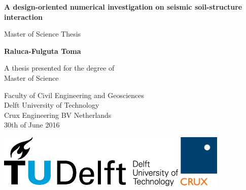 \documentclass[10pt,a4paper]{report}
\begin{document}
	\begin{titlepage}
		  \begin{center}
		  	\vspace*{3cm}
		  	
		  	\textbf{\Huge A design-oriented numerical investigation on seismic
		  		soil-structure interaction}
		  	
		  	\vspace{1cm}
		  	{\large Master of Science Thesis}
		  	
		  	\vspace{1.5cm}
		  	
		  	\textbf{\Large Raluca-Fulguta Toma}
		  	
		  	\vfill
		  	
		  	A thesis presented for the degree of\\
		  	Master of Science
		  	
		  	\vspace{0.8cm}
		  
		  	
			Faculty of Civil Engineering and Geosciences\\
		  	Delft University of Technology\\
		  	Crux Engineering BV
		  	Netherlands\\
		  	30th of June 2016
		  	
		  \end{center}
		
		\thispagestyle{empty}
		

		\clearpage
		\thispagestyle{empty}
					
		
		\vspace*{12cm}
		\begin{center}
			\includegraphics[height=1in]{"TUDLogo"}
			\hspace{2em}
			\includegraphics[height=1in]{"CRUXlogo"} \\
	

\end{center}
\end{titlepage}
\end{document}
